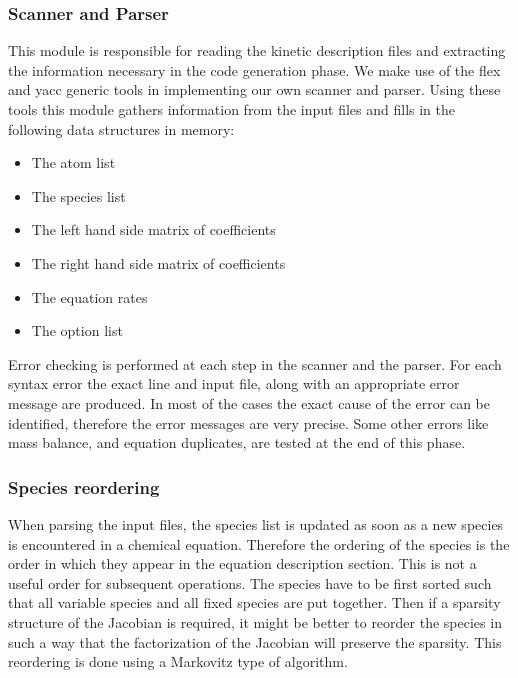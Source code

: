 \documentclass[twoside]{article}
\begin{document}
\subsubsection{Scanner and Parser}

This module is responsible for reading the kinetic description files and
extracting the information necessary in the code generation phase. We
make use of the flex and yacc generic tools in implementing our own
scanner and parser. Using these tools this module gathers information
from the input files and fills in the following data structures in
memory:
%
\begin{itemize}
\item The atom list
\item The species list
\item The left hand side matrix of coefficients
\item The right hand side matrix of coefficients
\item The equation rates
\item The option list
\end{itemize}
%
Error checking is performed at each step in the scanner and the parser.
For each syntax error the exact line and input file, along with an
appropriate error message are produced. In most of the cases the exact
cause of the error can be identified, therefore the error messages are
very precise. Some other errors like mass balance, and equation
duplicates, are tested at the end of this phase.

\subsubsection{Species reordering}

When parsing the input files, the species list is updated as soon as a
new species is encountered in a chemical equation. Therefore the
ordering of the species is the order in which they appear in the
equation description section. This is not a useful order for subsequent
operations. The species have to be first sorted such that all variable
species and all fixed species are put together. Then if a sparsity
structure of the Jacobian is required, it might be better to reorder the
species in such a way that the factorization of the Jacobian will
preserve the sparsity. This reordering is done using a Markovitz type of
algorithm.
\end{document}
